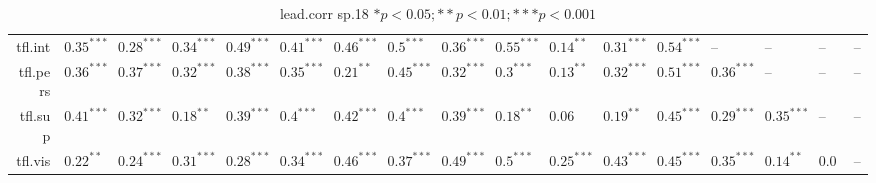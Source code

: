 \begin{table}[ht]
\begin{tabular}{rllllllllllllllll}
  tfl.int & $0.35^{***}$ & $0.28^{***}$ & $0.34^{***}$ & $0.49^{***}$ & $0.41^{***}$ & $0.46^{***}$ & $0.5^{***}$ & $0.36^{***}$ & $0.55^{***}$ & $0.14^{**}$ & $0.31^{***}$ & $0.54^{***}$ & -- & -- & -- & -- \\ 
  tfl.pers & $0.36^{***}$ & $0.37^{***}$ & $0.32^{***}$ & $0.38^{***}$ & $0.35^{***}$ & $0.21^{**}$ & $0.45^{***}$ & $0.32^{***}$ & $0.3^{***}$ & $0.13^{**}$ & $0.32^{***}$ & $0.51^{***}$ & $0.36^{***}$ & -- & -- & -- \\ 
  tfl.sup & $0.41^{***}$ & $0.32^{***}$ & $0.18^{**}$ & $0.39^{***}$ & $0.4^{***}$ & $0.42^{***}$ & $0.4^{***}$ & $0.39^{***}$ & $0.18^{**}$ & $0.06$ & $0.19^{**}$ & $0.45^{***}$ & $0.29^{***}$ & $0.35^{***}$ & -- & -- \\ 
  tfl.vis & $0.22^{**}$ & $0.24^{***}$ & $0.31^{***}$ & $0.28^{***}$ & $0.34^{***}$ & $0.46^{***}$ & $0.37^{***}$ & $0.49^{***}$ & $0.5^{***}$ & $0.25^{***}$ & $0.43^{***}$ & $0.45^{***}$ & $0.35^{***}$ & $0.14^{**}$ & $0.06$ & -- \\ 
   \hline
\end{tabular}
\caption{lead.corr sp.18 $* p < 0.05; ** p < 0.01; *** p < 0.001$} 
\label{freq_corr.lead.corr.sp.18}
\end{table}
